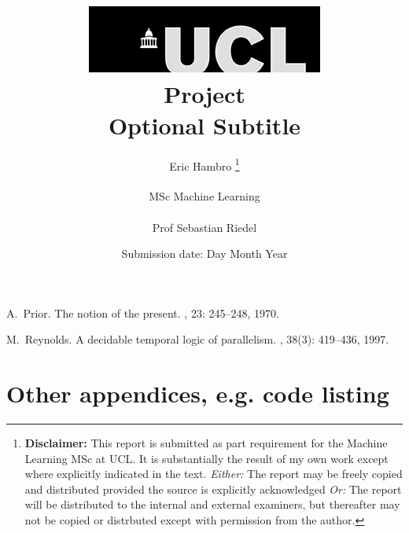 \documentclass{report}
\title{     
    { \includegraphics[scale=.5]{ucl_logo.png} \\}
    { \Huge Project \\ }
    { \large Optional Subtitle \\}
}
\date{Submission date: Day Month Year}
\author{
    Eric Hambro
    \thanks{ 
        {\bf Disclaimer:}
        This report is submitted as part requirement for the Machine Learning MSc at UCL. 
        It is substantially the result of my own work except where explicitly indicated in the text.
        \emph{Either:} The report may be freely copied and distributed provided the source is explicitly acknowledged
        \newline  %
        \emph{Or:}\newline
        The report will be distributed to the internal and external examiners, but thereafter may not be copied or distrbuted except with permission from the author.
    }
    \\ \\
    MSc Machine Learning\\ \\
    Prof Sebastian Riedel
}
\begin{document}
 












\appendix
 

 
  






\begin{thebibliography}{HHM99}


A.~Prior.
\newblock The notion of the present.
, 23:  245--248, 1970.


M.~Reynolds.
\newblock A decidable temporal logic of parallelism.
, 38(3):  419--436,
  1997.
\end{thebibliography}
\chapter{Other appendices, e.g. code listing}
\end{document}
